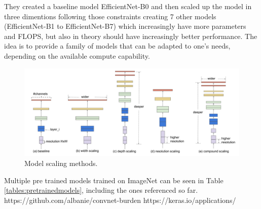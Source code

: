     They created a baseline model EfficientNet-B0 and then scaled up the model in three dimentions following those constraints creating 7 other models (EfficientNet-B1 to EfficientNet-B7) which increasingly have more parameters and FLOPS, but also in theory should have increasingly better performance. The idea is to provide a family of models that can be adapted to one's needs, depending on the available compute capability.
    
    \begin{figure}[ht]
      \centering
        \includegraphics[scale=0.5, width=\linewidth]{figs/modelscaling.png}
      \caption{Model scaling methods. \cite{efficientnet}}
      \label{fig:modelscaling}
    \end{figure}
    
    Multiple pre trained models trained on ImageNet can be seen in Table \ref{tables:pretrainedmodels}, including the ones referenced so far. https://github.com/albanie/convnet-burden
    https://keras.io/applications/
    
